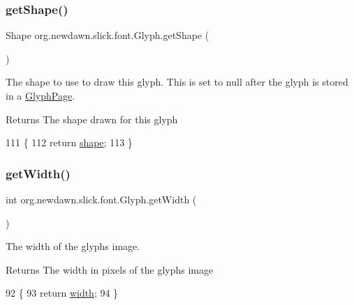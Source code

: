 \subsubsection{\texorpdfstring{get\+Shape()}{getShape()}}
{\footnotesize\ttfamily Shape org.\+newdawn.\+slick.\+font.\+Glyph.\+get\+Shape (\begin{DoxyParamCaption}{ }\end{DoxyParamCaption})\hspace{0.3cm}{\ttfamily [inline]}}

The shape to use to draw this glyph. This is set to null after the glyph is stored in a \mbox{\hyperlink{classorg_1_1newdawn_1_1slick_1_1font_1_1_glyph_page}{Glyph\+Page}}.

\begin{DoxyReturn}{Returns}
The shape drawn for this glyph 
\end{DoxyReturn}

\begin{DoxyCode}
111                              \{
112         \textcolor{keywordflow}{return} \mbox{\hyperlink{classorg_1_1newdawn_1_1slick_1_1font_1_1_glyph_a128faa13d2bf71ee4ce3cd3a77e7682f}{shape}};
113     \}
\end{DoxyCode}
\mbox{\label{classorg_1_1newdawn_1_1slick_1_1font_1_1_glyph_a7f5da97ec82f6546027ca72ba3e0e977}} 
\subsubsection{\texorpdfstring{get\+Width()}{getWidth()}}
{\footnotesize\ttfamily int org.\+newdawn.\+slick.\+font.\+Glyph.\+get\+Width (\begin{DoxyParamCaption}{ }\end{DoxyParamCaption})\hspace{0.3cm}{\ttfamily [inline]}}

The width of the glyph\textquotesingle{}s image.

\begin{DoxyReturn}{Returns}
The width in pixels of the glyphs image 
\end{DoxyReturn}

\begin{DoxyCode}
92                            \{
93         \textcolor{keywordflow}{return} \mbox{\hyperlink{classorg_1_1newdawn_1_1slick_1_1font_1_1_glyph_a3607f8f4c231c2f6cb6d212019d050f6}{width}};
94     \}
\end{DoxyCode}
\mbox{\label{classorg_1_1newdawn_1_1slick_1_1font_1_1_glyph_a97cae1e3c340df60b6d376726e2939ed}} 
